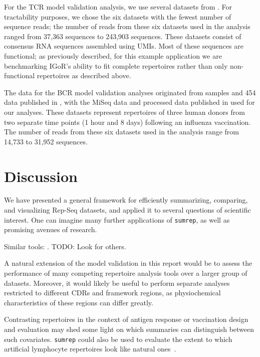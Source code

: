 \documentclass{article}
\begin{document}
For the TCR model validation analysis, we use several datasets from \cite{Britanova2016-iw}.
For tractability purposes, we chose the six datasets with the fewest number of sequence reads; the number of reads from these six datasets used in the analysis ranged from 37,363 sequences to 243,903 sequences.
These datasets consist of consensus RNA sequences assembled using UMIs.
Most of these sequences are functional; as previously described, for this example application we are benchmarking IGoR's ability to fit complete repertoires rather than only non-functional repertoires as described above.

The data for the BCR model validation analyses originated from samples and 454 data published in \cite{Laserson2014-dx}, with the MiSeq data and processed data published in \cite{Gupta2017-ve} used for our analyses.
These datasets represent repertoires of three human donors from two separate time points (1 hour and 8 days) following an influenza vaccination.
The number of reads from these six datasets used in the analysis range from 14,733 to 31,952 sequences.




\section*{Discussion}
We have presented a general framework for efficiently summarizing, comparing, and visualizing Rep-Seq datasets, and applied it to several questions of scientific interest.
One can imagine many further applications of \texttt{sumrep}, as well as promising avenues of research.

Similar tools: \cite{Nazarov2015-ok,Shugay2015-ur}.
TODO: Look for others.

A natural extension of the model validation in this report would be to assess the performance of many competing repertoire analysis tools over a larger group of datasets.
Moreover, it would likely be useful to perform separate analyses restricted to different CDRs and framework regions, as physiochemical characteristics of these regions can differ greatly.


Contrasting repertoires in the context of antigen response or vaccination design and evaluation may shed some light on which summaries can distinguish between such covariates.
\texttt{sumrep} could also be used to evaluate the extent to which artificial lymphocyte repertoires look like natural ones~\cite{Finlay2012}.
\end{document}
